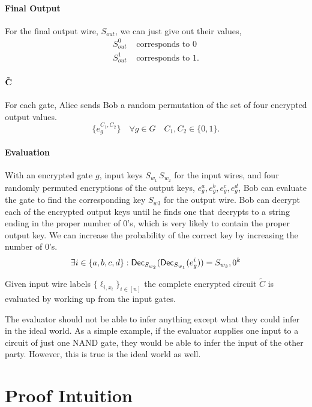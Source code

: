 \paragraph{Final Output}
For the final output wire, $S_{out}$, we can just give out their values,
\begin{align*}
S_{out}^0 &\text{ corresponds to 0}\\
S_{out}^1 &\text{ corresponds to 1.}
\end{align*}

\paragraph{$\bold{\tilde{C}}$}
For each gate, Alice sends Bob a random permutation of the set of four encrypted output values.
\[
\{e_g^{C_1, C_2} \} \quad \forall g \in G \quad C_1, C_2 \in \{0,1\}.
\]

\paragraph{Evaluation}
With an encrypted gate $g$,
input keys $S_{w_1} \, S_{w_2}$ for the input wires,
and four randomly permuted encryptions of the output keys, $e_g^{a}, e_g^{b}, e_g^{c}, e_g^{d}$,
Bob can evaluate the gate to find the corresponding key $S_{w3}$ for the output wire.
Bob can decrypt each of the encrypted output keys until he finds one that decrypts 
to a string ending in the proper number of $0$'s, which is very likely to contain the proper output key.
We can increase the probability of the correct key by increasing the number of $0$'s. 
\[
\exists  i \in \{a, b, c, d\} : \mathsf{Dec}_{S_{w_2}} ( \mathsf{Dec}_{S_{w_1}} ( e_g^{i} ))  = S_{w_3}, 0^k
\]

Given input wire labels 
$\{ \ell_{i, x_i} \}_{i \in [n]}$
the complete encrypted circuit $\tilde{C}$ is evaluated by working up from the input gates. 




The evaluator should not be able to infer anything except what they could infer in the ideal world.
As a simple example, if the evaluator supplies one input to a circuit of just one NAND gate,
 they would be able to infer the input of the other party. However, this is true is the ideal world as well.

\section{Proof Intuition}

